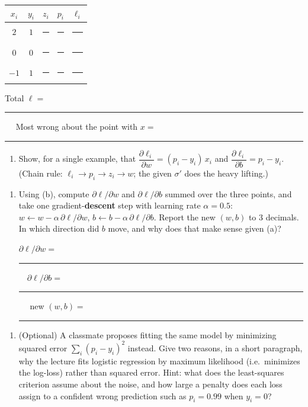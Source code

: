 \documentclass[
  11pt,
]{article}
\newcounter{none} %
\providecommand{\tightlist}{%
  \setlength{\itemsep}{0pt}\setlength{\parskip}{0pt}}
\newcommand{\answerspace}[1]{\par\vspace*{#1}}  %
\newcommand{\blank}[1][1.2in]{\rule{#1}{0.4pt}}
\newcommand{\answerpage}{\clearpage}
\begin{document}
{\def\LTcaptype{none} %
\begin{longtable}[]{@{}ccccc@{}}
\toprule\noalign{}
\(x_i\) & \(y_i\) & \(z_i\) & \(p_i\) & \(\ell_i\) \\
\midrule\noalign{}
\endhead
\bottomrule\noalign{}
\endlastfoot
\(2\) & \(1\) & \blank[0.8in] & \blank[0.8in] & \blank[0.8in] \\
\(0\) & \(0\) & \blank[0.8in] & \blank[0.8in] & \blank[0.8in] \\
\(-1\) & \(1\) & \blank[0.8in] & \blank[0.8in] & \blank[0.8in] \\
\end{longtable}
}

Total \(\ell =\) \blank[0.8in] \(\quad\) Most wrong about the point with
\(x =\) \blank[0.8in]

\answerspace{2in}
\answerpage

\begin{enumerate}
\def\labelenumi{(\alph{enumi})}
\setcounter{enumi}{1}
\tightlist
\item
  Show, for a single example, that
  \(\dfrac{\partial \ell_i}{\partial w} = (p_i - y_i)\,x_i\) and
  \(\dfrac{\partial \ell_i}{\partial b} = p_i - y_i\). (Chain rule:
  \(\ell_i \to p_i \to z_i \to w\); the given \(\sigma'\) does the heavy
  lifting.)
\end{enumerate}

\answerspace{3.5in}

\begin{enumerate}
\def\labelenumi{(\alph{enumi})}
\setcounter{enumi}{2}
\item
  Using (b), compute \(\partial\ell/\partial w\) and
  \(\partial\ell/\partial b\) summed over the three points, and take one
  gradient-\textbf{descent} step with learning rate \(\alpha = 0.5\):
  \(w \leftarrow w - \alpha\,\partial\ell/\partial w\),
  \(b \leftarrow b - \alpha\,\partial\ell/\partial b\). Report the new
  \((w, b)\) to 3 decimals. In which direction did \(b\) move, and why
  does that make sense given (a)?

  \(\partial\ell/\partial w =\)
  \blank[0.8in] \(\quad \partial\ell/\partial b =\)
  \blank[0.8in] \(\quad\) new \((w, b) =\) \blank[1.5in]
\end{enumerate}

\answerspace{2.5in}
\answerpage

\begin{enumerate}
\def\labelenumi{(\alph{enumi})}
\setcounter{enumi}{3}
\tightlist
\item
  (Optional) A classmate proposes fitting the same model by minimizing
  squared error \(\sum_i (p_i - y_i)^2\) instead. Give two reasons, in a
  short paragraph, why the lecture fits logistic regression by maximum
  likelihood (i.e.~minimizes the log-loss) rather than squared error.
  Hint: what does the least-squares criterion assume about the noise,
  and how large a penalty does each loss assign to a confident wrong
  prediction such as \(p_i = 0.99\) when \(y_i = 0\)?
\end{enumerate}
\end{document}
